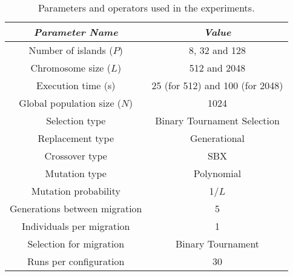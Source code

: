 \documentclass[Afour,sageh,times]{sagej}
\begin{document}






\begin{table}
\begin{center}
\begin{tabular}{|c|c|}
\hline
{\em Parameter Name} & {\em Value} \\ \hline
Number of islands ($P$) & 8, 32 and 128 \\ \hline
Chromosome size ($L$) & 512 and 2048 \\ \hline
Execution time (s) & 25 (for 512) and 100 (for 2048) \\ \hline \hline
Global population size ($N$) & 1024 \\ \hline
Selection type & Binary Tournament Selection \\ \hline
Replacement type & Generational \\ \hline 
Crossover type & SBX \\ \hline
Mutation  type & Polynomial\\ \hline
Mutation probability & 1/$L$ \\ \hline
Generations between migration & 5 \\ \hline
Individuals per migration & 1 \\ \hline
Selection for migration & Binary Tournament\\ \hline
Runs per configuration & 30 \\ \hline
\end{tabular}
\caption{Parameters and operators used in the experiments.}
\label{tab:parameters}
\end{center}
\end{table}
\end{document}
